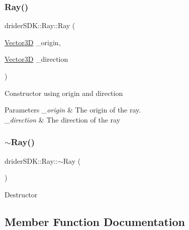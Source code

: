 \subsubsection{\texorpdfstring{Ray()}{Ray()}\hspace{0.1cm}{\footnotesize\ttfamily [2/2]}}
{\footnotesize\ttfamily drider\+S\+D\+K\+::\+Ray\+::\+Ray (\begin{DoxyParamCaption}\item[{\hyperlink{classdrider_s_d_k_1_1_vector3_d}{Vector3D}}]{\+\_\+origin,  }\item[{\hyperlink{classdrider_s_d_k_1_1_vector3_d}{Vector3D}}]{\+\_\+direction }\end{DoxyParamCaption})\hspace{0.3cm}{\ttfamily [inline]}}

Constructor using origin and direction


\begin{DoxyParams}{Parameters}
{\em \+\_\+origin} & The origin of the ray.\\
\hline
{\em \+\_\+direction} & The direction of the ray \\
\hline
\end{DoxyParams}
\mbox{\label{classdrider_s_d_k_1_1_ray_ac2aa7e3196cacec5d6a8b739cef4405f}} 
\subsubsection{\texorpdfstring{$\sim$\+Ray()}{~Ray()}}
{\footnotesize\ttfamily drider\+S\+D\+K\+::\+Ray\+::$\sim$\+Ray (\begin{DoxyParamCaption}{ }\end{DoxyParamCaption})\hspace{0.3cm}{\ttfamily [inline]}}

Destructor 

\subsection{Member Function Documentation}
\mbox{\label{classdrider_s_d_k_1_1_ray_ae82712f2cf693847b3a5f7f15254ed16}} 

